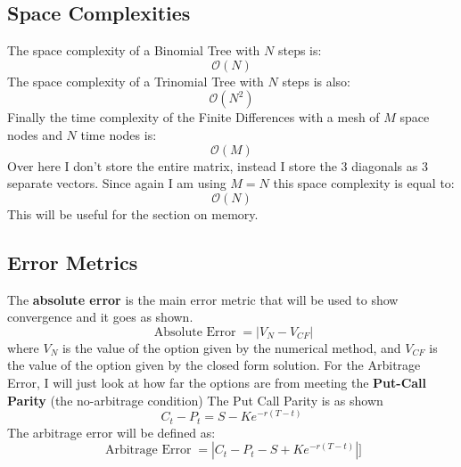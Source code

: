 \documentclass[12pt]{article}
\numberwithin{equation}{section}
\begin{document}
\subsection{Space Complexities}
The space complexity of a Binomial Tree with $N$ steps is:
\begin{equation}
	\boxed{\mathcal{O}(N)}
\end{equation}
The space complexity of a Trinomial Tree with $N$ steps is also:
\begin{equation}
	\boxed{\mathcal{O}(N^2)}
\end{equation}
Finally the time complexity of the Finite Differences with a mesh of $M$ space nodes and $N$ time nodes is:
\begin{equation}
	\boxed{\mathcal{O}(M)}
\end{equation}
Over here I don't store the entire matrix, instead I store the 3 diagonals as 3 separate vectors. Since again I am using $M=N$ this space complexity is equal to:
\begin{equation}
	\boxed{\mathcal{O}(N)}
\end{equation}
This will be useful for the section on memory. 
\subsection{Error Metrics}
The \textbf{absolute error} is the main error metric that will be used to show convergence and it goes as shown.
\begin{equation}
	\boxed{\operatorname{Absolute  \hspace{4pt} Error} =  |V_N - V_{CF} |}
\end{equation}
where $V_N$ is the value of the option given by the numerical method, and $V_{CF}$ is the value of the option given by the closed form solution. 
\newline 
For the Arbitrage Error, I will just look at how far the options are from meeting the \textbf{Put-Call Parity} (the no-arbitrage condition)
The Put Call Parity is as shown
\begin{equation}
	C_t - P_t = S - Ke^{-r(T-t)}
\end{equation}
The arbitrage error will be defined as:
\begin{equation}
	\boxed{\operatorname{Arbitrage \hspace{4pt} Error} = |C_t - P_t - S + Ke^{-r(T-t)}|}]
\end{equation}
\newpage
\end{document}
